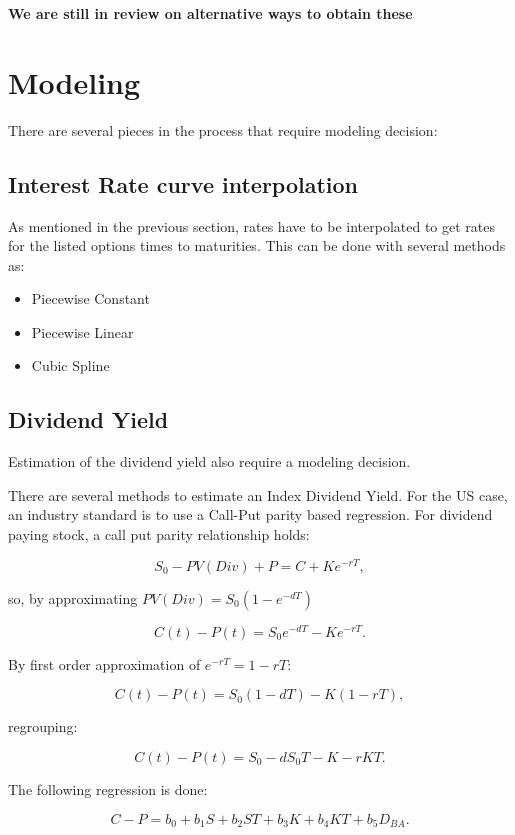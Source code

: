 \documentclass[11pt,confidential]{article}
\begin{document}
\textbf{We are still in review on alternative ways to obtain these }


\section{Modeling}

There are several pieces in the process that require modeling decision:

\subsection{Interest Rate curve interpolation}

As mentioned in the previous section, rates have to be interpolated to get rates for the listed options times to maturities.
This can be done with several methods as:

\begin{itemize}
\item Piecewise Constant
\item Piecewise Linear
\item Cubic Spline
\end{itemize}


\subsection{Dividend Yield}

Estimation of the dividend yield also require a modeling decision.

There are several methods to estimate an Index Dividend Yield. For the US case, an industry standard is to use a Call-Put parity based regression. For dividend paying stock, a call put parity relationship holds:

\[S_0 - PV(Div) + P = C + K e^{-rT},\]

\noindent so, by approximating $PV(Div) = S_0(1-e^{-dT})$

\[C(t) -P(t) = S_0 e^{-dT} - K e^{-rT}.\]

By first order approximation of $e^{-rT}=1-rT$:

\[C(t) -P(t) = S_0 (1-dT) - K (1-rT),\]

regrouping:

\[C(t) -P(t) = S_0 - d S_0 T - K- rKT.\]

The following regression is done:

\[C -P = b_0 + b_1 S + b_2 ST + b_3 K + b_4 KT + b_5 D_{BA}.\]
\end{document}
